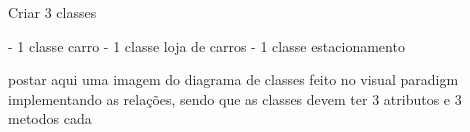 Criar 3 classes

- 1 classe carro
- 1 classe loja de carros
- 1 classe estacionamento

postar aqui uma imagem do diagrama de classes feito no visual paradigm implementando as relações, 
sendo que as classes devem ter 3 atributos e 3 metodos cada